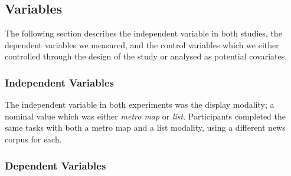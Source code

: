 \subsection{Variables}

The following section describes the independent variable in both studies, the dependent variables we measured, and the control variables which we either controlled through the design of the study or analysed as potential covariates.

\subsubsection{Independent Variables}

The independent variable in both experiments was the display modality; a nominal value which was either \textit{metro map} or \textit{list}. Participants completed the same tasks with both a metro map and a list modality, using a different news corpus for each.

\subsubsection{Dependent Variables}

